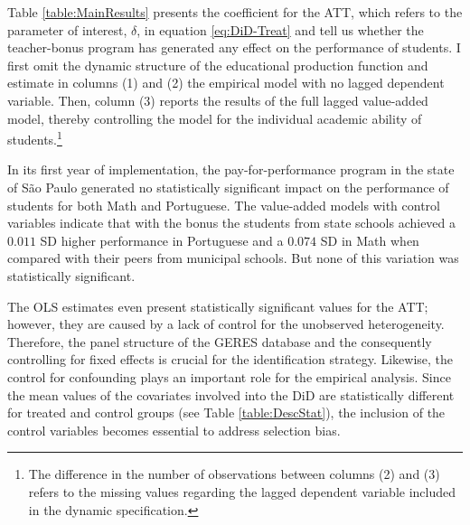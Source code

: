 \documentclass[a4paper, 12pt]{article}
\begin{document}
Table \ref{table:MainResults} presents the coefficient for the ATT, which refers to the parameter of interest, $\delta$, in equation \eqref{eq:DiD-Treat} and tell us whether the teacher-bonus program has generated any effect on the performance of students. I first omit the dynamic structure of the educational production function and estimate in columns (1) and (2) the empirical model with no lagged dependent variable. Then, column (3) reports the results of the full lagged value-added model, thereby controlling the model for the individual academic ability of students.\footnote{The difference in the number of observations between columns (2) and (3) refers to the missing values regarding the lagged dependent variable included in the dynamic specification.}

  
In its first year of implementation, the pay-for-performance program in the state of São Paulo generated no statistically significant impact on the performance of students for both Math and Portuguese. The value-added models with control variables indicate that with the bonus the students from state schools achieved a $0.011$ SD higher performance in Portuguese and a $0.074$ SD in Math when compared with their peers from municipal schools. But none of this variation was statistically significant.

The OLS estimates even present statistically significant values for the ATT; however, they are caused by a lack of control for the unobserved heterogeneity. Therefore, the panel structure of the GERES database and the consequently controlling for fixed effects is crucial for the identification strategy. Likewise, the control for confounding plays an important role for the empirical analysis. Since the mean values of the covariates involved into the DiD are statistically different for treated and control groups (see Table \ref{table:DescStat}), the inclusion of the control variables becomes essential to address selection bias.
\end{document}
